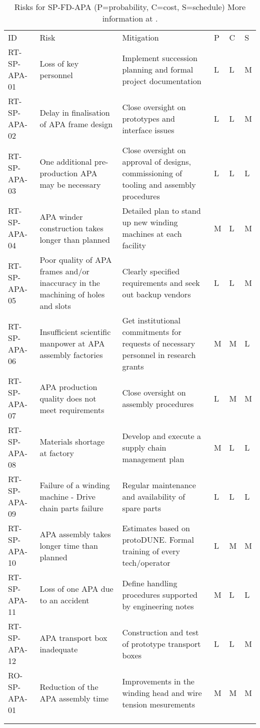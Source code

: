 
\begin{footnotesize}
\begin{longtable}{P{0.18\textwidth}P{0.20\textwidth}P{0.32\textwidth}P{0.02\textwidth}P{0.02\textwidth}P{0.02\textwidth}} 
\caption[Risks for SP-FD-APA]{Risks for SP-FD-APA (P=probability, C=cost, S=schedule) More information at . } \\
ID & Risk & Mitigation & P & C & S  \\  \colhline
RT-SP-APA-01 & Loss of key personnel & Implement succession planning and formal project documentation & L & L & M \\  \colhline
RT-SP-APA-02 & Delay in finalisation of APA frame design & Close oversight on prototypes and interface issues & L & L & M \\  \colhline
RT-SP-APA-03 & One additional pre-production APA may be necessary & Close oversight on approval of designs, commissioning of tooling and assembly procedures & L & L & L \\  \colhline
RT-SP-APA-04 & APA winder construction takes longer than planned & Detailed plan to stand up new winding machines at each facility & M & L & M \\  \colhline
RT-SP-APA-05 & Poor quality of APA frames and/or inaccuracy in the machining of holes and slots & Clearly specified requirements and seek out backup vendors & L & L & M \\  \colhline
RT-SP-APA-06 & Insufficient scientific manpower at APA assembly factories & Get institutional commitments for requests of necessary personnel in research grants & M & M & L \\  \colhline
RT-SP-APA-07 & APA production quality does not meet requirements & Close oversight on assembly procedures & L & M & M \\  \colhline
RT-SP-APA-08 & Materials shortage at factory & Develop and execute a supply chain management plan & M & L & L \\  \colhline
RT-SP-APA-09 & Failure of a winding machine - Drive chain parts failure & Regular maintenance and availability of spare parts & L & L & L \\  \colhline
RT-SP-APA-10 & APA assembly takes longer time than planned  & Estimates based on protoDUNE. Formal training of every tech/operator & L & M & M \\  \colhline
RT-SP-APA-11 & Loss of one APA due to an accident & Define handling procedures supported by engineering notes & M & L & L \\  \colhline
RT-SP-APA-12 & APA transport box inadequate & Construction and test of prototype transport boxes & L & L & M \\  \colhline
RO-SP-APA-01 & Reduction of the APA assembly time & Improvements in the winding head and wire tension mesurements & M & M & M \\  \colhline
 &  &  &  &  &  \\  \colhline


\end{longtable}
\end{footnotesize}
